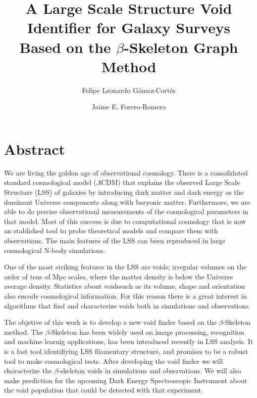 \documentclass[manuscript]{aastex62}
\begin{document}
\title{A Large Scale Structure Void Identifier for Galaxy Surveys
  Based on the $\beta$-Skeleton Graph Method}


\author{Felipe Leonardo G\'omez-Cort\'es}

\nocollaboration


\author{Jaime E. Forero-Romero}


\section*{Abstract}

  We are living the golden age of observational cosmology. 
  There is a consolidated standard cosmological model ($\Lambda$CDM) that explains the observed
  Large Scale Structure (LSS) of galaxies by introducing dark matter and
  dark energy as the dominant Universe components along with baryonic matter.
  Furthermore,  we are able to do precise observatioanl measurements of the 
  cosmological parameters in that model. 
  Most of this success is due to computational cosmology that is now 
  an stablished tool to probe theoretical models and compare them with observations.
  The main features of the LSS can been reproduced in large cosmological N-body simulations.
  
  One of the most striking features in the LSS are voids; irregular 
  volumes on the order of tens of Mpc scales, where the matter density is below the Universe
  average density. 
  Statistics about voidssuch as its volume, shape and orientation also encode cosmological information.
  For this reason there is a great interest in algorithms that find and characterize voids
  both in simulations and observations.

  The objetive of this work is to develop a new void finder  based
  on the $\beta$-Skeleton method.
  The $\beta$-Skeleton has been widely used on image processing,
  recognition and machine learnig applications, has been introduced
  recently in LSS analysis. It is a fast tool identifiying LSS filamentary structure,
  and promises to be a robust tool to make cosmological tests.
  After developing the void finder we will characterize the $\beta$-skeleton voids
  in simulations and observations. We will also make prediction for the upcoming
  Dark Energy Spectroscopic Instrument about the void population that could be detected
  with that experiment.
  
\end{document}
